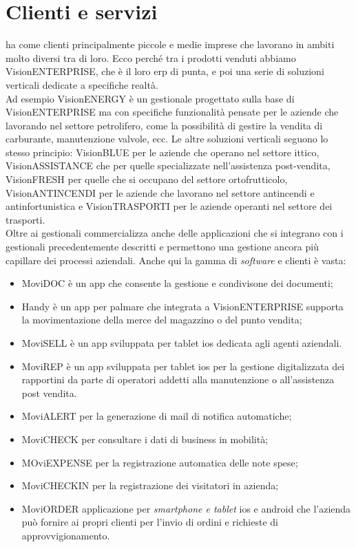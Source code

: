 \section{Clienti e servizi}
{\company} ha come clienti principalmente piccole e medie imprese che lavorano in ambiti molto diversi tra di loro.
Ecco perché tra i prodotti venduti abbiamo VisionENTERPRISE, che è il loro \gls{erp} di punta, e poi una serie di soluzioni 
verticali dedicate a specifiche realtà.\\
Ad esempio VisionENERGY è un gestionale progettato sulla base di VisionENTERPRISE ma con specifiche funzionalità pensate 
per le aziende che lavorando nel settore petrolifero, come la possibilità di gestire la vendita di carburante, manutenzione valvole, ecc.
Le altre soluzioni verticali seguono lo stesso principio: VisionBLUE per le aziende che operano nel settore ittico, 
VisionASSISTANCE che per quelle specializzate nell'assistenza post-vendita, VisionFRESH per quelle che si occupano del settore ortofrutticolo, 
VisionANTINCENDI per le aziende che lavorano nel settore antincendi e antinfortunistica e VisionTRASPORTI per le aziende operanti nel settore dei trasporti.\\
Oltre ai gestionali {\company} commercializza anche delle applicazioni che si integrano con i gestionali precedentemente descritti e permettono 
una gestione ancora più capillare dei processi aziendali. Anche qui la gamma di \textit{software} e clienti è vasta: 
\begin{itemize}
    \item MoviDOC è un app che consente la gestione e condivisone dei documenti;
    \item Handy è un app per palmare che integrata a VisionENTERPRISE supporta la movimentazione della merce del magazzino o del punto vendita;
    \item MoviSELL è un app sviluppata per tablet \gls{ios} dedicata agli agenti aziendali.
    \item MoviREP è un app sviluppata per tablet \gls{ios} per la gestione digitalizzata dei rapportini da parte di operatori addetti alla manutenzione o 
          all'assistenza post vendita. 
    \item MoviALERT per la generazione di mail di notifica automatiche;
    \item MoviCHECK per consultare i dati di business in mobilità;
    \item MOviEXPENSE per la registrazione automatica delle note spese;
    \item MoviCHECKIN per la registrazione dei visitatori in azienda;
    \item MoviORDER applicazione per \textit{smartphone e tablet} \gls{ios} e \gls{android} che l’azienda può fornire ai propri clienti per l’invio di ordini e 
          richieste di approvvigionamento.
\end{itemize}

